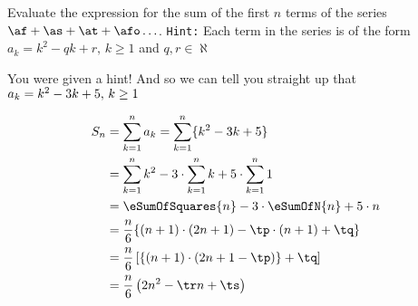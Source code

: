 



\gcalcexpr[0]
\gcalcexpr[0]
\gcalcexpr[0]
\gcalcexpr[0]

\gcalcexpr[0]
\gcalcexpr[0]
\gcalcexpr[0]
\gcalcexpr[0]

\question[4] Evaluate the expression for the sum of the first $n$ terms of the 
series $\af + \as + \at + \afo \ldots$. \texttt{Hint:} Each term in the series is 
of the form $a_k = k^2 - qk + r, \, k \geq 1$ and $q,r \in\aleph$

\watchout

\ifprintanswers
\fi 

\begin{solution}[\halfpage]
  You were given a hint! And so we can tell you straight up that $a_k = k^2 - 3 k + 5,\, k \geq 1$
	
	\begin{align}
		S_n &= \sum_{k=1}^{n}a_k = \sum_{k=1}^{n}\lbrace k^2 - \vbone k + \vbtwo \rbrace \\
		&= \sum_{k=1}^{n}k^2 - \vbone\cdot\sum_{k=1}^{n}k + \vbtwo\cdot\sum_{k=1}^{n}1 \\
		&= \eSumOfSquares{n} - \vbone\cdot\eSumOfN{n} + \vbtwo\cdot n \\
    &= \dfrac{n}{6}\lbrace (n+1)\cdot(2n+1) - \tp\cdot(n+1) + \tq \rbrace \\
    &= \dfrac{n}{6}\left[ \lbrace (n+1)\cdot(2n + 1 - \tp)\rbrace + \tq \right] \\
    &= \dfrac{n}{6}\left( 2n^2 - \tr n + \ts \right)
	\end{align}
\end{solution}
